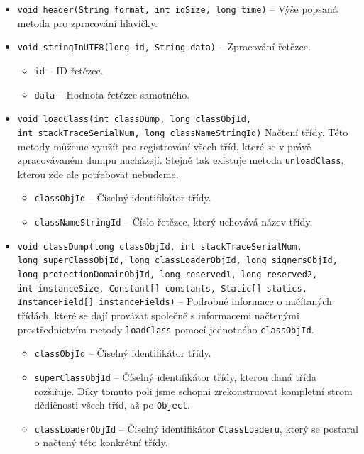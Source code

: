 \begin{itemize}
    \item \texttt{void header(String format, int idSize, long time)} -- Výše popsaná metoda pro zpracování hlavičky.
    \item \texttt{void stringInUTF8(long id, String data)} -- Zpracování řetězce.
        \begin{itemize}
            \item \texttt{id} -- ID řetězce.
            \item \texttt{data} -- Hodnota řetězce samotného.
        \end{itemize}
    \item \texttt{void loadClass(int classDump, long classObjId,\\ int stackTraceSerialNum, long classNameStringId)} Načtení třídy. Této metody můžeme využít pro registrování všech tříd, které se v právě zpracovávaném dumpu nacházejí. Stejně tak existuje metoda \texttt{unloadClass}, kterou zde ale potřebovat nebudeme.
        \begin{itemize}
            \item \texttt{classObjId} -- Číselný identifikátor třídy.
            \item \texttt{classNameStringId} -- Číslo řetězce, který uchovává název třídy.
        \end{itemize}
    \item \texttt{void classDump(long classObjId,
    int stackTraceSerialNum, \\
    long superClassObjId,
    long classLoaderObjId,
    long signersObjId, \\
    long protectionDomainObjId,
    long reserved1,
    long reserved2,\\
    int instanceSize,
    Constant[] constants,
    Static[] statics,\\
    InstanceField[] instanceFields)} -- Podrobné informace o načítaných třídách, které se dají provázat společně s informacemi načtenými prostřednictvím metody \texttt{loadClass} pomocí jednotného \texttt{classObjId}.
        \begin{itemize}
            \item \texttt{classObjId} -- Číselný identifikátor třídy.
            \item \texttt{superClassObjId} -- Číselný identifikátor třídy, kterou daná třída rozšiřuje. Díky tomuto poli jsme schopni zrekonstruovat kompletní strom dědičnosti všech tříd, až po \texttt{Object}.
            \item \texttt{classLoaderObjId} -- Číselný identifikátor \texttt{Class\-Loaderu}, který se postaral o načtený této konkrétní třídy.

\end{itemize}
\end{itemize}
